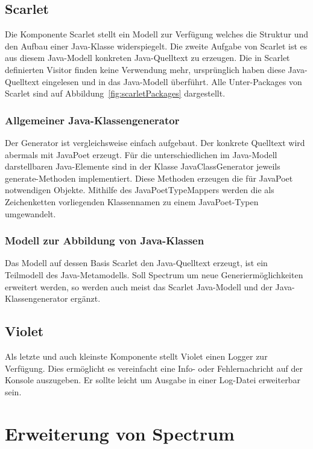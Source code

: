 \documentclass[12pt,oneside,a4paper,parskip]{scrbook}
\begin{document}
\subsection{Scarlet}

Die Komponente Scarlet stellt ein Modell zur Verfügung welches die Struktur und den Aufbau einer Java-Klasse widerspiegelt. Die zweite Aufgabe von Scarlet ist es aus diesem Java-Modell konkreten Java-Quelltext zu erzeugen. Die in Scarlet definierten Visitor finden keine Verwendung mehr, ursprünglich haben diese Java-Quelltext eingelesen und in das Java-Modell überführt. Alle Unter-Packages von Scarlet sind auf Abbildung~\ref{fig:scarletPackages} dargestellt.

\subsubsection{Allgemeiner Java-Klassengenerator}

Der Generator ist vergleichsweise einfach aufgebaut. Der konkrete Quelltext wird abermals mit JavaPoet erzeugt. Für die unterschiedlichen im Java-Modell darstellbaren Java-Elemente sind in der Klasse JavaClassGenerator jeweils generate-Methoden implementiert. Diese Methoden erzeugen die für JavaPoet notwendigen Objekte. Mithilfe des JavaPoetTypeMappers werden die als Zeichenketten vorliegenden Klassennamen zu einem JavaPoet-Typen umgewandelt.

\subsubsection{Modell zur Abbildung von Java-Klassen}

Das Modell auf dessen Basis Scarlet den Java-Quelltext erzeugt, ist ein Teilmodell des Java-Metamodells. Soll Spectrum um neue Generiermöglichkeiten erweitert werden, so werden auch meist das Scarlet Java-Modell und der Java-Klassengenerator ergänzt.

\subsection{Violet}

Als letzte und auch kleinste Komponente stellt Violet einen Logger zur Verfügung. Dies ermöglicht es vereinfacht eine Info- oder Fehlernachricht auf der Konsole auszugeben. Er sollte leicht um Ausgabe in einer Log-Datei erweiterbar sein.

\section{Erweiterung von Spectrum}
\end{document}
